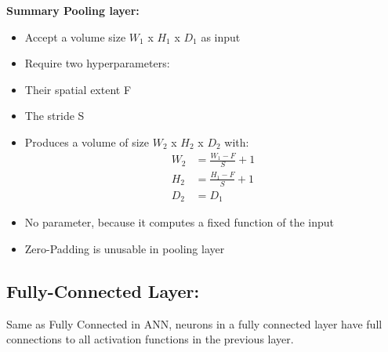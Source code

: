 \vspace{-1cm}
\textbf{Summary Pooling layer:}
\begin{itemize}
	\item Accept a volume size $W_{1}$ x $H_{1}$ x $D_{1}$ as input
	\item Require two hyperparameters:
	\item Their spatial extent F 
	\item The stride S
	\item Produces a volume of size $W_{2}$ x $H_{2}$ x $D_{2}$ with:
	\begin{align*}
	W_{2} &= \frac{W_{1} - F }{S} + 1\\
	H_{2} &= \frac{H_{1} - F }{S} + 1\\
	D_{2} &= D_{1}
	\end{align*}
	\item No parameter, because it computes a fixed function of the input\\
	\item Zero-Padding is unusable in pooling layer
\end{itemize}



\subsection{Fully-Connected Layer:}
Same as Fully Connected in ANN, neurons in a fully connected layer have full connections to all activation functions in the previous layer. 

